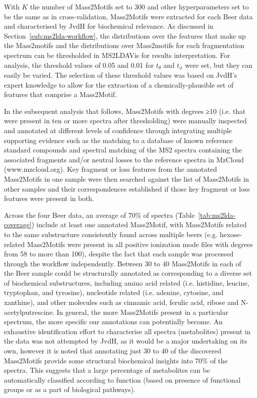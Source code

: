 With $K$ the number of Mass2Motifs set to 300 and other hyperparameters set to be the same as in cross-validation, Mass2Motifs were extracted for each Beer data and characterised by JvdH for biochemical relevance. As discussed in Section~\ref{sub:ms2lda-workflow}, the distributions over the features that make up the Mass2motifs and the distributions over Mass2motifs for each fragmentation spectrum can be thresholded in MS2LDAVis for results interpretation. For analysis, the threshold values of 0.05 and 0.01 for $t_{\theta}$ and $t_{\phi}$ were set, but they can easily be varied. The selection of these threshold values was based on JvdH's expert knowledge to allow for the extraction of a chemically-plausible set of features that comprise a Mass2Motif.

In the subsequent analysis that follows, Mass2Motifs with degrees ≥10 (i.e. that were present in ten or more spectra after thresholding) were manually inspected and annotated at different levels of confidence through integrating multiple supporting evidence such as the matching to a database of known reference standard compounds and spectral matching of the MS2 spectra containing the associated fragments and/or neutral losses to the reference spectra in MzCloud (www.mzcloud.org). Key fragment or loss features from the annotated Mass2Motifs in one sample were then searched against the list of Mass2Motifs in other samples and their correspondences established if those key fragment or loss features were present in both. 

Across the four Beer data, an average of 70\% of spectra (Table~\ref{tab:ms2lda-coverage}) include at least one annotated Mass2Motif, with Mass2Motifs related to the same substructure consistently found across multiple beers (e.g. hexose-related Mass2Motifs were present in all positive ionization mode files with degrees from 58 to more than 100), despite the fact that each sample was processed through the workflow independently. Between 30 to 40 Mass2Motifs in each of the Beer sample could be structurally annotated as corresponding to a diverse set of biochemical substructures, including amino acid related (i.e. histidine, leucine, tryptophan, and tyrosine), nucleotide related (i.e. adenine, cytosine, and xanthine), and other molecules such as cinnamic acid, ferulic acid, ribose and N-acetylputrescine. In general, the more Mass2Motifs present in a particular spectrum, the more specific our annotations can potentially become. An exhaustive identification effort to characterise all spectra (metabolites) present in the data was not attempted by JvdH, as it would be a major undertaking on its own, however it is noted that annotating just 30 to 40 of the discovered Mass2Motifs provide some structural biochemical insights into 70\% of the spectra. This suggests that a large percentage of metabolites can be automatically classified according to function (based on presence of functional groups or as a part of biological pathways). 


